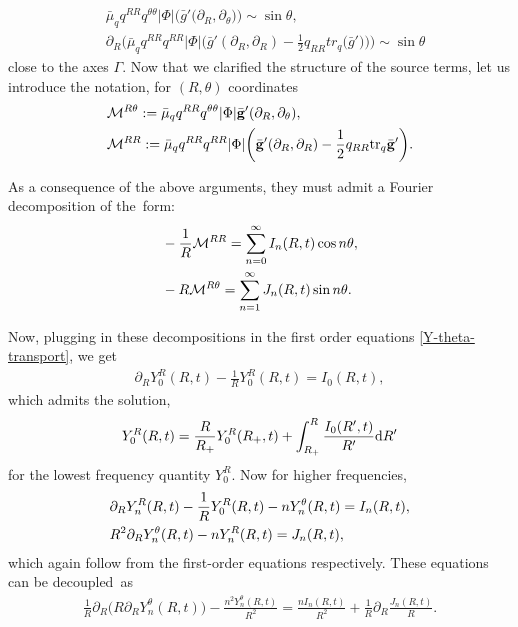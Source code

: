 \documentclass[11pt]{article}
\numberwithin{equation}{section}
\def\ptl{\partial}%
\def\cal#1{\mathcal{#1}}%
\def\halb{\frac{1}{2}}%
\newcommand{\bgg}{{\bar{\bf g}}}
\numberwithin{equation}{section}
\begin{document}
\begin{align*}
& \bar{\mu}_q q^{RR} q^{\theta \theta} \vert \Phi \vert \bigl(\bar{g}' \bigl(\ptl_R, \ptl_\theta\bigr)\bigr)\sim \sin \theta ,\\
&\ptl_R \biggl(\bar{\mu}_q q^{RR} q^{RR} \vert \Phi \vert \biggl(\bar{g}' (\ptl_R, \ptl_R) - \halb q_{RR} tr_q \bigl(\bar{g}'\bigr)\biggr)\biggr) \sim \sin \theta
\end{align*}
close to the axes $\Gamma$. Now that we clarified the structure of the source terms, let us introduce the notation, for $(R, \theta)$ coordinates
\begin{align*}
&\cal{M}^{ R \theta }:= \bar{\mu}_q q^{RR} q^{\theta \theta} \vert \Phi \vert \bgg'(\ptl_R, \ptl_\theta), \notag\\
&\cal{M}^{R R}:= \bar{\mu}_q q^{R R} q^{RR} \vert \Phi \vert \biggl(\bgg' (\ptl_R, \ptl_R) - \halb q_{RR} {\rm tr}_q \bgg'\biggr).
\end{align*}

 As a consequence of the above arguments, they must admit a Fourier decomposition of the~form:
\begin{align*}
&- \frac{1}{R} \mathcal{M}^{RR}= \sum^\infty_{n = 0} I_n (R, t) \cos n \theta , \notag\\
&-R \mathcal{M}^{R \theta}= \sum^\infty_{n=1} J_n (R, t) \sin n \theta.
\end{align*}

Now, plugging in these decompositions in the first order equations \eqref{Y-theta-transport}, we
get
\begin{align*}
\ptl_R Y^R_0 (R, t) - \frac{1}{R} Y^R_0 (R, t) = I_0 (R, t),
\end{align*}
which admits the solution,
\begin{align*}
Y^R_0 (R, t) = \frac{R}{R_+} Y_0^R (R_+, t) + \int^R_{R_+} \frac{I_0 (R', t)}{R'} {\rm d}R'
\end{align*}
for the lowest frequency quantity $Y^R_0$. Now for higher frequencies,
\begin{align*}
&\ptl_R Y_n^R (R, t) - \frac{1}{R} Y^R_0 (R, t) - n Y^\theta_n (R, t)= I_n (R, t), \notag\\
& R^2 \ptl_R Y^\theta _n (R, t) - n Y^R_n (R, t) = J_n (R, t),
\end{align*}
which again follow from the first-order equations respectively. These equations can be decoupled~as
\begin{align} \label{Y-first-order-modes}
\frac{1}{R} \ptl_R \bigl(R \ptl_R Y^\theta_n (R, t)\bigr) - \frac{n^2 Y^\theta_n(R, t)}{R^2} = \frac{n I_n (R, t)}{R^2} + \frac{1}{R}
\ptl_R \frac{J_n (R, t)}{R}.
\end{align}
\end{document}
